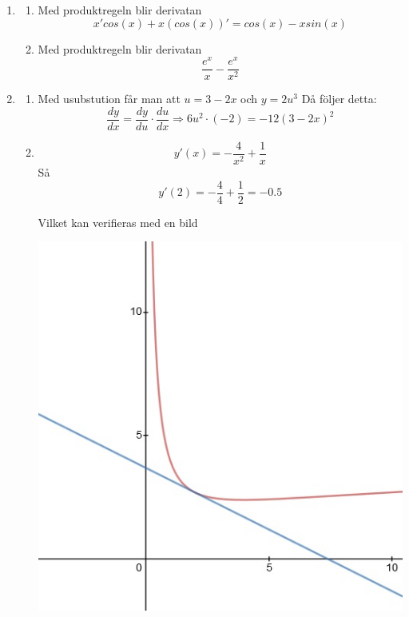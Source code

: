 \documentclass[a4paper,12pt]{article}
\begin{document}
\begin{enumerate}
    \item \begin{enumerate}
        \item Med produktregeln blir derivatan
        $$x'cos(x)+x(cos(x))'=cos(x)-xsin(x)$$

        \item Med produktregeln blir derivatan
        $$\frac{e^x}{x}-\frac{e^x}{x^2}$$
    \end{enumerate}

    \item \begin{enumerate}
        \item Med usubstution får man att $u=3-2x$ och $y=2u^3$
        Då följer detta:
        $$\frac{dy}{dx}=\frac{dy}{du}\cdot \frac{du}{dx}
        \Rightarrow 6u^2\cdot(-2)=-12(3-2x)^2$$

        \item $$y'(x)=-\frac{4}{x^2}+\frac{1}{x}$$
        Så 
        $$y'(2)=-\frac{4}{4}+\frac{1}{2}=-0.5$$

        Vilket kan verifieras med en bild

        \begin{center}
            \includegraphics[scale=0.5]{Figur 1.jpg}
        \end{center}
    \end{enumerate}


\end{enumerate}
\end{document}
